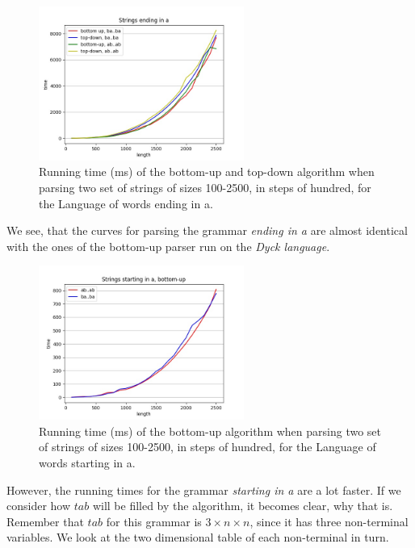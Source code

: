 \begin{figure}[h!]
    \centering
    \includegraphics[width=0.6\textwidth]{Resources/t_ea_td_bu.jpg}
    \caption{Running time (ms) of the bottom-up and top-down algorithm when parsing two set of strings of sizes 100-2500, in steps of hundred, for the Language of words ending in a.}
    \label{fig:t_ea_td_bu}
\end{figure}

We see, that the curves for parsing the grammar \textit{ending in a} are almost identical with the ones of the bottom-up parser run on the \textit{Dyck language}.

\begin{figure}[h!]
    \centering
    \includegraphics[width=0.6\textwidth]{Resources/t_sa_bu.jpg}
    \caption{Running time (ms) of the bottom-up algorithm when parsing two set of strings of sizes 100-2500, in steps of hundred, for the Language of words starting in a.}
    \label{fig:t_sa_bu}
\end{figure}

However, the running times for the grammar \textit{starting in a} are a lot faster.
If we consider how $tab$ will be filled by the algorithm, it becomes clear, why that is.
Remember that $tab$ for this grammar is $3\times n\times n$, since it has three non-terminal variables.
We look at the two dimensional table of each non-terminal in turn.

